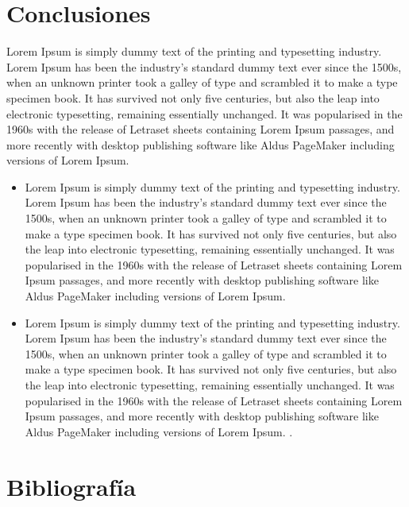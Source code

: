 \documentclass[11pt, spanish]{article}
\begin{document}
\section{Conclusiones}

Lorem Ipsum is simply dummy text of the printing and typesetting industry. Lorem Ipsum has been the industry's standard dummy text ever since the 1500s, when an unknown printer took a galley of type and scrambled it to make a type specimen book. It has survived not only five centuries, but also the leap into electronic typesetting, remaining essentially unchanged. It was popularised in the 1960s with the release of Letraset sheets containing Lorem Ipsum passages, and more recently with desktop publishing software like Aldus PageMaker including versions of Lorem Ipsum.



\begin{itemize}
  \item Lorem Ipsum is simply dummy text of the printing and typesetting industry. Lorem Ipsum has been the industry's standard dummy text ever since the 1500s, when an unknown printer took a galley of type and scrambled it to make a type specimen book. It has survived not only five centuries, but also the leap into electronic typesetting, remaining essentially unchanged. It was popularised in the 1960s with the release of Letraset sheets containing Lorem Ipsum passages, and more recently with desktop publishing software like Aldus PageMaker including versions of Lorem Ipsum.
  
   \item Lorem Ipsum is simply dummy text of the printing and typesetting industry. Lorem Ipsum has been the industry's standard dummy text ever since the 1500s, when an unknown printer took a galley of type and scrambled it to make a type specimen book. It has survived not only five centuries, but also the leap into electronic typesetting, remaining essentially unchanged. It was popularised in the 1960s with the release of Letraset sheets containing Lorem Ipsum passages, and more recently with desktop publishing software like Aldus PageMaker including versions of Lorem Ipsum. \cite{norman}.
\end{itemize}

\newpage
\section{Bibliografía}
\end{document}
